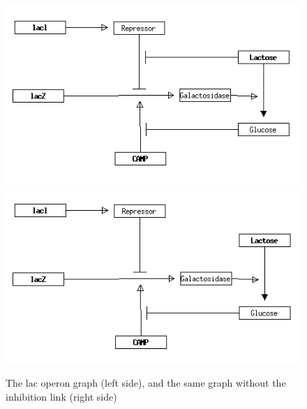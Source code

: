 \documentclass[a4paper]{article}
\begin{document}
\begin{figure}[htb]
\begin{center}
  \includegraphics[scale=0.3]{lac0001.png}
  \includegraphics[scale=0.3]{lac_r.png}
\end{center}
\caption{The  lac operon graph (left side), and the same graph without
  the inhibition link (right side)}
\label{fig:supergraph}
\end{figure}
\end{document}
